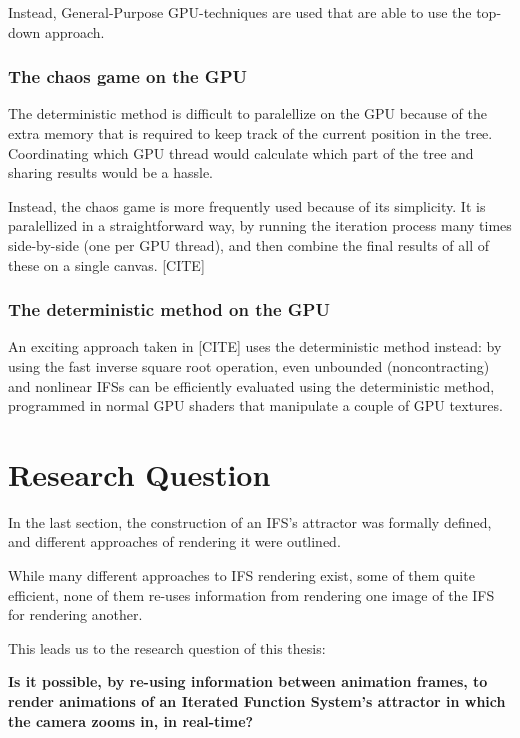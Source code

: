\documentclass[11pt]{article}
\begin{document}
Instead, General-Purpose GPU-techniques are used that are able to use the top-down approach.

\subsubsection{The chaos game on the GPU}
\label{sec:org084431d}
\label{subsection:chaos_game_gpu}

The deterministic method is difficult to paralellize on the GPU because of the extra memory that is required to keep track of the current position in the tree.
Coordinating which GPU thread would calculate which part of the tree and sharing results would be a hassle.

Instead, the chaos game is more frequently used because of its simplicity. It is paralellized in a straightforward way, by running the iteration process many times side-by-side (one per GPU thread),
and then combine the final results of all of these on a single canvas. [CITE]

\subsubsection{The deterministic method on the GPU}
\label{sec:orgb1f39b4}
\label{subsection:deterministic_gpu}

An exciting approach taken in [CITE] uses the deterministic method instead:
by using the fast inverse square root operation, even unbounded (noncontracting) and nonlinear IFSs can be efficiently
evaluated using the deterministic method, programmed in normal GPU shaders that manipulate a couple of GPU textures.


\section{Research Question}
\label{sec:org2b50a11}
\label{section:research_question}

In the last section, the construction of an IFS's attractor was formally defined, 
and different approaches of rendering it were outlined.

While many different approaches to IFS rendering exist, some of them quite efficient,
none of them re-uses information from rendering one image of the IFS for rendering another.

This leads us to the research question of this thesis:

\textbf{\textbf{Is it possible, by re-using information between animation frames, to render animations of an Iterated Function System's attractor in which the camera zooms in, in real-time?}}
\end{document}
